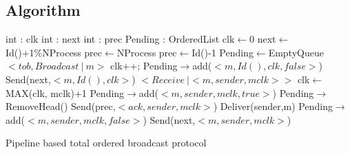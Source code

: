 \documentclass[a4paper]{article}
\begin{document}
        \subsection{Algorithm}
        \begin{algorithm}[H]
            \centering
            \begin{algorithmic}[5]
                \Data
                \State int : clk
                \State int : next
                \State int : prec
                \State Pending : OrderedList
                \EndData
                \Init
                \State clk$\gets$0
                \State next$\gets$Id()+1\%NProcess
                \State prec$\gets$NProcess
                \Else
                \State prec$\gets$Id()-1
                \EndIf
                \State Pending$\gets$EmptyQueue
                \EndInit
                \Event $< tob,Broadcast\ |\ m> $
                \State clk++;
                \State Pending$\rightarrow$add($<m,Id(), clk, false>$) 
                \State Send(next,$<m,Id(),clk>$)
                \EndEvent
                \Event $<Receive\ | <m,sender, mclk>>$
                \State clk$\gets$MAX(clk, mclk)+1
                \State Pending$\rightarrow$add($<m,sender,mclk,true>$)
                \State Pending$\rightarrow$RemoveHead()
                \State Send(prec,$<ack,sender,mclk>$)
                \State Deliver(sender,m)
                \EndIf
                \Else
                \State Pending$\rightarrow$add($<m,sender,mclk,false>$)
                \State Send(next,$<m,sender,mclk>$)
                \EndIf
                \EndEvent
            \end{algorithmic}
            \caption{Pipeline based total ordered broadcast protocol}
        \end{algorithm}
\end{document}
